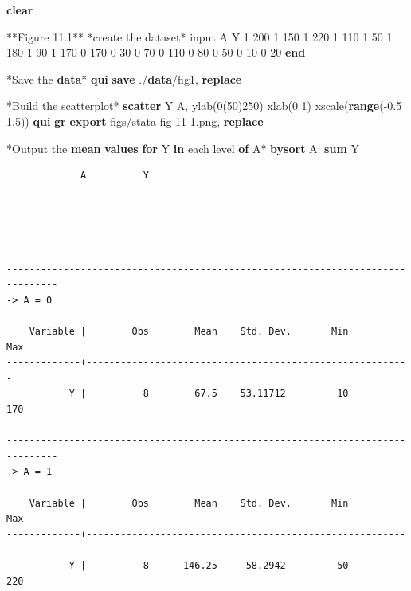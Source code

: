 \documentclass[
  10pt,
]{book}
\newenvironment{Shaded}{\begin{snugshade}}{\end{snugshade}}
\newcommand{\BaseNTok}[1]{\textcolor[rgb]{0.00,0.00,0.81}{#1}}
\newcommand{\DecValTok}[1]{\textcolor[rgb]{0.00,0.00,0.81}{#1}}
\newcommand{\KeywordTok}[1]{\textcolor[rgb]{0.13,0.29,0.53}{\textbf{#1}}}
\newcommand{\NormalTok}[1]{#1}
\begin{document}
\begin{Shaded}
\begin{Highlighting}[]
\KeywordTok{clear}

\NormalTok{**Figure 11.1**}
\NormalTok{*create the dataset*}
\NormalTok{input A Y}
\NormalTok{1 200}
\NormalTok{1 150}
\NormalTok{1 220}
\NormalTok{1 110}
\NormalTok{1 50}
\NormalTok{1 180}
\NormalTok{1 90}
\NormalTok{1 170}
\NormalTok{0 170}
\NormalTok{0 30}
\NormalTok{0 70}
\NormalTok{0 110}
\NormalTok{0 80}
\NormalTok{0 50}
\NormalTok{0 10}
\NormalTok{0 20}
\KeywordTok{end}

\NormalTok{*Save the }\KeywordTok{data}\NormalTok{*}
\KeywordTok{qui} \KeywordTok{save}\NormalTok{ ./}\KeywordTok{data}\NormalTok{/fig1, }\KeywordTok{replace}

\NormalTok{*Build the scatterplot*}
\KeywordTok{scatter}\NormalTok{ Y A, ylab(0(50)250) xlab(0 1) }\BaseNTok{xscale}\NormalTok{(}\KeywordTok{range}\NormalTok{(-0.5 1.5))}
\KeywordTok{qui} \KeywordTok{gr} \KeywordTok{export}\NormalTok{ figs/stata-fig-11-1.png, }\KeywordTok{replace}

\NormalTok{*Output the }\KeywordTok{mean} \KeywordTok{values} \KeywordTok{for}\NormalTok{ Y }\KeywordTok{in}\NormalTok{ each }\DecValTok{level} \KeywordTok{of}\NormalTok{ A*}
\KeywordTok{bysort}\NormalTok{ A: }\KeywordTok{sum}\NormalTok{ Y}
\end{Highlighting}
\end{Shaded}

\begin{verbatim}
             A          Y





-------------------------------------------------------------------------------
-> A = 0

    Variable |        Obs        Mean    Std. Dev.       Min        Max
-------------+---------------------------------------------------------
           Y |          8        67.5    53.11712         10        170

-------------------------------------------------------------------------------
-> A = 1

    Variable |        Obs        Mean    Std. Dev.       Min        Max
-------------+---------------------------------------------------------
           Y |          8      146.25     58.2942         50        220
\end{verbatim}
\end{document}
